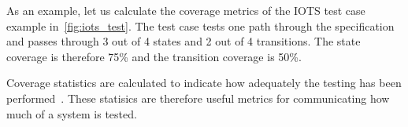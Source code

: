 As an example, let us calculate the coverage metrics of the IOTS test case example in~\ref{fig:iots_test}. The test case tests one path through the specification and passes through 3 out of 4 states and 2 out of 4 transitions. The state coverage is therefore 75\% and the transition coverage is 50\%.

Coverage statistics are calculated to indicate how adequately the testing has been performed~\cite{Zhu:coverage}. These statisics are therefore useful metrics for communicating how much of a system is tested.

